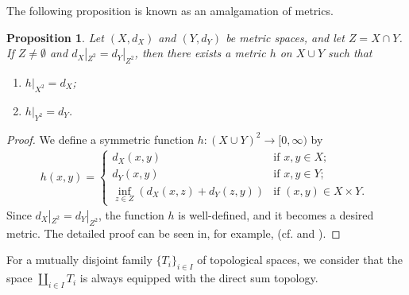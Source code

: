 \documentclass[a4paper, 12pt]{amsart}
\theoremstyle{plain}
\newtheorem{prop}[thm]{Proposition}
\theoremstyle{definition}
\theoremstyle{remark}
\begin{document}
The following   proposition
is  known as  an amalgamation of metrics.  
\begin{prop}\label{prop:amal1}
Let 
$(X, d_{X})$ 
and 
$(Y, d_{Y})$ 
be metric spaces, 
and let 
$Z=X\cap Y$. 
If 
$Z\neq \emptyset$ 
and 
$d_{X}|_{Z^2}=d_{Y}|_{Z^2}$, 
then there exists a metric
 $h$ on 
$X\cup Y$ 
such that 
\begin{enumerate}
	\item $h|_{X^2}=d_{X}$; 
	\item $h|_{Y^2}=d_{Y}$. 
\end{enumerate}
\end{prop}
\begin{proof}
We define a symmetric function 
$h: (X\cup Y)^2\to [0, \infty)$ 
by
\begin{align*}
	h(x, y)=
		\begin{cases}
		d_X(x, y) & \text{if $x, y\in X$;}\\
		d_Y(x, y) & \text{if $x, y\in Y$;}\\
		\inf_{z\in Z}(d_X(x, z)+d_Y(z, y)) & \text{if $(x, y)\in X\times Y$. }
		\end{cases}
\end{align*}
Since 
$d_{X}|_{Z^2}=d_{Y}|_{Z^2}$, 
the function 
$h$
 is well-defined, and it becomes a desired metric. 
 The detailed proof can be seen in, for example, 
\cite{MR1918193}
 (cf. \cite{Ury1927} and \cite{MR105082}). 
\end{proof}

 
 
 
 For a mutually disjoint family 
$\{T_{i}\}_{i\in I}$ 
of  topological spaces, 
we consider that  the space 
$\coprod_{i\in I}T_{i}$ 
is always equipped
 with the direct sum topology.

 
 
 
\end{document}
